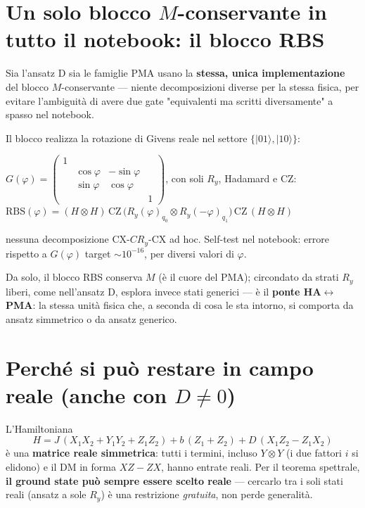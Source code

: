 \documentclass[11pt,a4paper]{article}
\begin{document}
\section{Un solo blocco $M$-conservante in tutto il notebook: il blocco RBS}

Sia l'ansatz D sia le famiglie PMA usano la \textbf{stessa, unica
implementazione} del blocco $M$-conservante --- niente decomposizioni
diverse per la stessa fisica, per evitare l'ambiguità di avere due gate
"equivalenti ma scritti diversamente" a spasso nel notebook.

Il blocco realizza la rotazione di Givens reale nel settore
$\{|01\rangle,|10\rangle\}$:
\begin{keyeq}
\centering
$G(\varphi)=\begin{pmatrix}1&&&\\&\cos\varphi&-\sin\varphi&\\&\sin\varphi&\cos\varphi&\\&&&1\end{pmatrix}$,
\quad con soli $R_y$, Hadamard e CZ:\\[4pt]
$\mathrm{RBS}(\varphi) = (H\otimes H)\,\mathrm{CZ}\,\big(R_y(\varphi)_{q_0}\otimes R_y(-\varphi)_{q_1}\big)\,\mathrm{CZ}\,(H\otimes H)$
\end{keyeq}
nessuna decomposizione CX-$CR_y$-CX ad hoc. Self-test nel notebook:
errore rispetto a $G(\varphi)$ target $\sim10^{-16}$, per diversi valori
di $\varphi$.

Da solo, il blocco RBS conserva $M$ (è il cuore del PMA); circondato da
strati $R_y$ liberi, come nell'ansatz D, esplora invece stati generici
--- è il \textbf{ponte HA$\leftrightarrow$PMA}: la stessa unità fisica
che, a seconda di cosa le sta intorno, si comporta da ansatz simmetrico
o da ansatz generico.

\section{Perché si può restare in campo reale (anche con $D\neq0$)}

L'Hamiltoniana
$$H = J\,(X_1X_2+Y_1Y_2+Z_1Z_2) + b\,(Z_1+Z_2) + D\,(X_1Z_2 - Z_1X_2)$$
è una \textbf{matrice reale simmetrica}: tutti i termini, incluso
$Y\otimes Y$ (i due fattori $i$ si elidono) e il DM in forma $XZ-ZX$,
hanno entrate reali. Per il teorema spettrale, \textbf{il ground state
può sempre essere scelto reale} --- cercarlo tra i soli stati reali
(ansatz a sole $R_y$) è una restrizione \emph{gratuita}, non perde
generalità.
\end{document}
